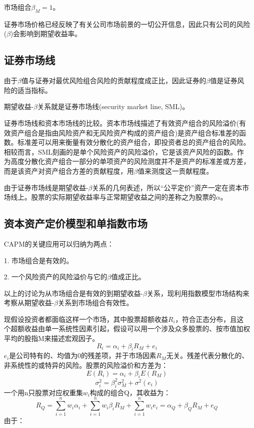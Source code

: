 \documentclass{article}
\begin{document}
市场组合$ \beta_M=1 $。

证券市场价格已经反映了有关公司市场前景的一切公开信息，因此只有公司的风险($ \beta $)会影响到期望收益率。

\subsection{证券市场线}
由于$ \beta $值与证券对最优风险组合风险的贡献程度成正比，因此证券的$ \beta $值是证券风险的适当指标。

期望收益-$ \beta $关系就是证券市场线(security market line, SML)。

证券市场线和资本市场线的比较。资本市场线描述了有效资产组合的风险溢价(有效资产组合是指由风险资产和无风险资产构成的资产组合)是资产组合标准差的函数。标准差可以用来衡量有效分散化的资产组合，即投资者总的资产组合的风险。相较而言，SML刻画的是单个风险资产的风险溢价，它是该资产风险的函数。作为高度分散化资产组合一部分的单项资产的风险测度并不是资产的标准差或方差，而是该资产对资产组合方差的贡献程度，用$ \beta $值来测度这一贡献程度。

由于证券市场线是期望收益-$ \beta $关系的几何表述，所以“公平定价”资产一定在资本市场线上。股票的实际期望收益率与正常期望收益之间的差称之为股票的$ \alpha $。

\subsection{资本资产定价模型和单指数市场}
CAPM的关键应用可以归纳为两点：

1. 市场组合是有效的。

2. 一个风险资产的风险溢价与它的$ \beta $值成正比。

以上的讨论为从市场组合是有效的到期望收益-$ \beta $关系，现利用指数模型市场结构来考察从期望收益-$ \beta $关系到市场组合有效性。

\hspace*{\fill}

现假设投资者都面临这样一个市场，其中股票超额收益$ R_i $，符合正态分布，且这个超额收益由单一系统性因素引起，假设可以用一个涉及众多股票的、按市值加权平均的股指M来描述宏观因子。
\[
R_i=\alpha_i+\beta_iR_M+e_i
\]
$ e_i $是公司特有的、均值为0的残差项，并于市场因素$ R_M $无关。残差代表分散化的、非系统性的或特异的风险。股票的风险溢价和方差为：
\[
E(R_i)=\alpha_i+\beta_iE(R_M)
\]
\[
\sigma^2_i=\beta^2_i\sigma_M^2+\sigma^2(e_i)
\]
一个用n只股票对应权重集$ w_i $构成的组合Q，其收益为：
\[
R_Q=\sum_{i=1}^{n}w_i\alpha_i+\sum_{i=1}^{n}w_i\beta_iR_M+\sum_{i=1}^{n}w_ie_i=\alpha_Q+\beta_QR_M+e_Q
\]
由于：
\end{document}
